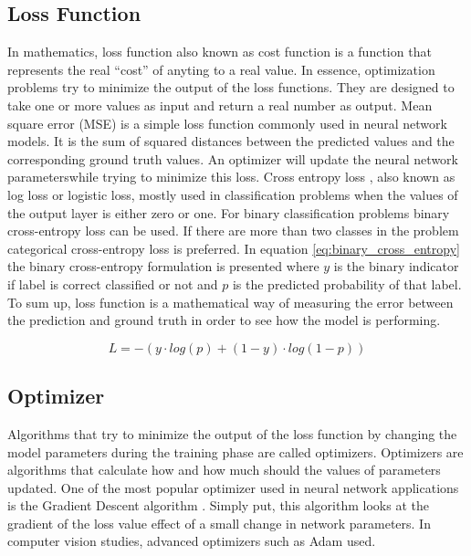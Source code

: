 \subsection{Loss Function}

In mathematics, loss function also known as cost function is a function that represents the real “cost” of anyting to a real value. In essence, optimization problems try to minimize the output of the loss functions. They are designed to take one or more values as input and return a real number as output. Mean square error (MSE) is a simple loss function commonly used in neural network models. It is the sum of squared distances between the predicted values and the corresponding ground truth values. An optimizer will update the neural network parameterswhile trying to minimize this loss. Cross entropy loss \cite{cross_entropy}, also known as log loss or logistic loss, mostly used in classification problems when the values of the output layer is either zero or one. For binary classification problems binary cross-entropy loss can be used. If there are more than two classes in the problem categorical cross-entropy loss is preferred. In equation \ref{eq:binary_cross_entropy} the binary cross-entropy formulation is presented where \(y\) is the binary indicator if label is correct classified or not and \(p\) is the predicted probability of that label. To sum up, loss function is a mathematical way of measuring the error between the prediction and ground truth in order to see how the model is performing.

\begin{equation}
    L = -(y \cdot log(p) + (1-y) \cdot log(1 - p))
    \label{eq:binary_cross_entropy}
\end{equation}

\subsection{Optimizer}

Algorithms that try to minimize the output of the loss function by changing the model parameters during the training phase are called optimizers. Optimizers are algorithms that calculate how and how much should the values of parameters updated. One of the most popular optimizer used in neural network applications is the Gradient Descent algorithm \cite{gradient_descent}. Simply put, this algorithm looks at the gradient of the loss value effect of a small change in network parameters. In computer vision studies, advanced optimizers such as Adam \cite{adam} used.

